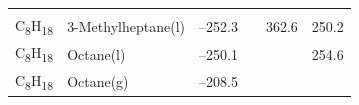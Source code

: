\documentclass[
  9pt,
]{extbook}
\theoremstyle{definition}
\theoremstyle{definition}
\theoremstyle{definition}
\theoremstyle{remark}
\begin{document}
\begin{longtable}[]{@{}llllll@{}}
\begin{minipage}[t]{0.14\columnwidth}
\strut
\end{minipage}\tabularnewline
\begin{minipage}[t]{0.07\columnwidth}\raggedright
C\textsubscript{8}H\textsubscript{18}\strut
\end{minipage} & \begin{minipage}[t]{0.17\columnwidth}\raggedright
3-Methylheptane(l)\strut
\end{minipage} & \begin{minipage}[t]{0.15\columnwidth}\raggedright
--252.3\strut
\end{minipage} & \begin{minipage}[t]{0.15\columnwidth}\raggedright
\strut
\end{minipage} & \begin{minipage}[t]{0.14\columnwidth}\raggedright
362.6\strut
\end{minipage} & \begin{minipage}[t]{0.14\columnwidth}\raggedright
250.2\strut
\end{minipage}\tabularnewline
\begin{minipage}[t]{0.07\columnwidth}\raggedright
C\textsubscript{8}H\textsubscript{18}\strut
\end{minipage} & \begin{minipage}[t]{0.17\columnwidth}\raggedright
Octane(l)\strut
\end{minipage} & \begin{minipage}[t]{0.15\columnwidth}\raggedright
--250.1\strut
\end{minipage} & \begin{minipage}[t]{0.15\columnwidth}\raggedright
\strut
\end{minipage} & \begin{minipage}[t]{0.14\columnwidth}\raggedright
\strut
\end{minipage} & \begin{minipage}[t]{0.14\columnwidth}\raggedright
254.6\strut
\end{minipage}\tabularnewline
\begin{minipage}[t]{0.07\columnwidth}\raggedright
C\textsubscript{8}H\textsubscript{18}\strut
\end{minipage} & \begin{minipage}[t]{0.17\columnwidth}\raggedright
Octane(g)\strut
\end{minipage} & \begin{minipage}[t]{0.15\columnwidth}\raggedright
--208.5\strut
\end{minipage} & \begin{minipage}[t]{0.15\columnwidth}\raggedright

\end{minipage}
\end{longtable}
\end{document}
